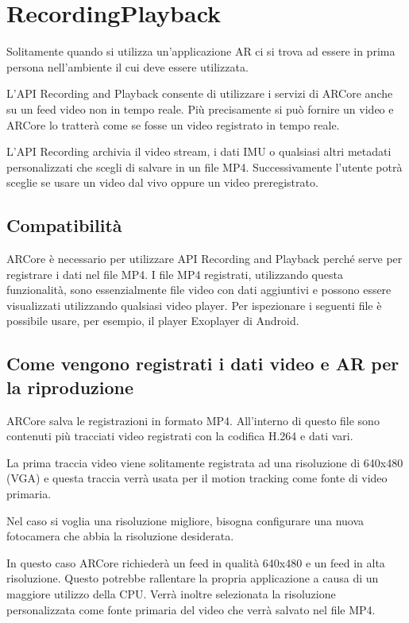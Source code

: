 \documentclass[crop=false, class=book]{standalone}
\begin{document}
	\chapter{RecordingPlayback}
	
	Solitamente quando si utilizza un’applicazione AR ci si trova ad essere in prima persona nell’ambiente il cui deve essere utilizzata.
	
	L'API Recording and Playback consente di utilizzare i servizi di ARCore anche su un feed video non in tempo reale. Più precisamente si può fornire un video e ARCore lo tratterà come se fosse un video registrato in tempo reale.
	
	L'API Recording archivia il video stream, i dati IMU o qualsiasi altri metadati personalizzati che scegli di salvare in un file MP4. Successivamente l’utente potrà sceglie se usare un video dal vivo oppure un video preregistrato.
 
	\section{Compatibilità}
	ARCore è necessario per utilizzare API Recording and Playback perché serve per registrare i dati nel file MP4. I file MP4 registrati, utilizzando questa funzionalità, sono essenzialmente file video con dati aggiuntivi  e possono essere visualizzati utilizzando qualsiasi video player. Per ispezionare i seguenti file è possibile usare, per esempio, il player Exoplayer di Android.
	 
	\section{Come vengono registrati i dati video e AR per la riproduzione}
	ARCore salva le registrazioni in formato MP4. All’interno di questo file sono contenuti più tracciati video registrati con la codifica H.264 e dati vari.
	
	La prima traccia video viene solitamente registrata ad una risoluzione di 640x480 (VGA) e questa traccia verrà usata per il motion tracking come fonte di video primaria.
	
	Nel caso si voglia una risoluzione migliore, bisogna configurare una nuova fotocamera che abbia la risoluzione desiderata.
	
	In questo caso ARCore richiederà un feed in qualità 640x480 e un feed in alta risoluzione. Questo potrebbe rallentare la propria applicazione a causa di un maggiore utilizzo della CPU. Verrà inoltre selezionata la risoluzione personalizzata come fonte primaria del video che verrà salvato nel file MP4.
	
\end{document}
